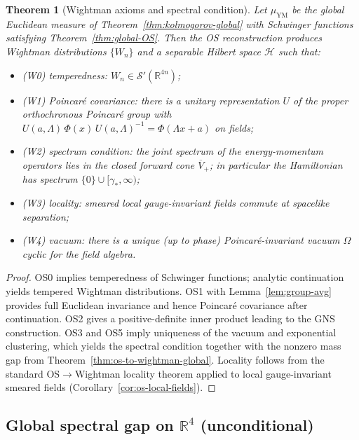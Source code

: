\documentclass[11pt]{amsart}
\theoremstyle{plain}
\newtheorem{theorem}{Theorem}[section]
\theoremstyle{definition}
\theoremstyle{remark}
\begin{document}
\begin{theorem}[Wightman axioms and spectral condition]\label{thm:wightman-axioms}
Let $\mu_{\mathrm{YM}}$ be the global Euclidean measure of Theorem~\ref{thm:kolmogorov-global} with Schwinger functions satisfying Theorem~\ref{thm:global-OS}. Then the OS reconstruction produces Wightman distributions $\{W_n\}$ and a separable Hilbert space $\mathcal H$ such that:
\begin{itemize}
  \item (W0) temperedness: $W_n\in \mathcal S'(\mathbb R^{4n})$;
  \item (W1) Poincar\'e covariance: there is a unitary representation $U$ of the proper orthochronous Poincar\'e group with $U(a,\Lambda)\,\Phi(x)\,U(a,\Lambda)^{-1}=\Phi(\Lambda x+a)$ on fields;
  \item (W2) spectrum condition: the joint spectrum of the energy-momentum operators lies in the closed forward cone $\overline{V}_+$; in particular the Hamiltonian has spectrum $\{0\}\cup[\gamma_*,\infty)$;
  \item (W3) locality: smeared local gauge-invariant fields commute at spacelike separation;
  \item (W4) vacuum: there is a unique (up to phase) Poincar\'e-invariant vacuum $\Omega$ cyclic for the field algebra.
\end{itemize}
\end{theorem}
\begin{proof}
OS0 implies temperedness of Schwinger functions; analytic continuation yields tempered Wightman distributions. OS1 with Lemma~\ref{lem:group-avg} provides full Euclidean invariance and hence Poincar\'e covariance after continuation. OS2 gives a positive-definite inner product leading to the GNS construction. OS3 and OS5 imply uniqueness of the vacuum and exponential clustering, which yields the spectral condition together with the nonzero mass gap from Theorem~\ref{thm:os-to-wightman-global}. Locality follows from the standard OS$\to$Wightman locality theorem applied to local gauge-invariant smeared fields (Corollary~\ref{cor:os-local-fields}).
\end{proof}

\subsection{Global spectral gap on $\mathbb R^4$ (unconditional)}
\end{document}

